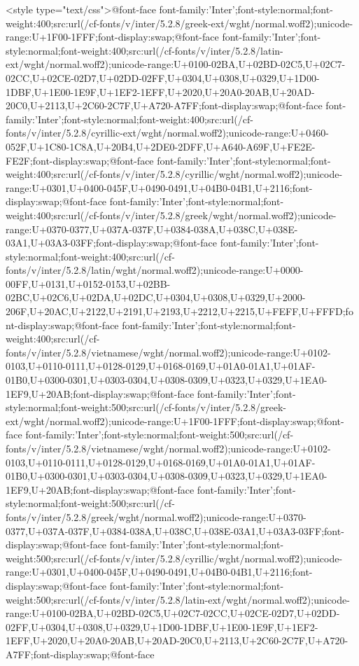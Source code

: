     <style type="text/css">@font-face {font-family:'Inter';font-style:normal;font-weight:400;src:url(/cf-fonts/v/inter/5.2.8/greek-ext/wght/normal.woff2);unicode-range:U+1F00-1FFF;font-display:swap;}@font-face {font-family:'Inter';font-style:normal;font-weight:400;src:url(/cf-fonts/v/inter/5.2.8/latin-ext/wght/normal.woff2);unicode-range:U+0100-02BA,U+02BD-02C5,U+02C7-02CC,U+02CE-02D7,U+02DD-02FF,U+0304,U+0308,U+0329,U+1D00-1DBF,U+1E00-1E9F,U+1EF2-1EFF,U+2020,U+20A0-20AB,U+20AD-20C0,U+2113,U+2C60-2C7F,U+A720-A7FF;font-display:swap;}@font-face {font-family:'Inter';font-style:normal;font-weight:400;src:url(/cf-fonts/v/inter/5.2.8/cyrillic-ext/wght/normal.woff2);unicode-range:U+0460-052F,U+1C80-1C8A,U+20B4,U+2DE0-2DFF,U+A640-A69F,U+FE2E-FE2F;font-display:swap;}@font-face {font-family:'Inter';font-style:normal;font-weight:400;src:url(/cf-fonts/v/inter/5.2.8/cyrillic/wght/normal.woff2);unicode-range:U+0301,U+0400-045F,U+0490-0491,U+04B0-04B1,U+2116;font-display:swap;}@font-face {font-family:'Inter';font-style:normal;font-weight:400;src:url(/cf-fonts/v/inter/5.2.8/greek/wght/normal.woff2);unicode-range:U+0370-0377,U+037A-037F,U+0384-038A,U+038C,U+038E-03A1,U+03A3-03FF;font-display:swap;}@font-face {font-family:'Inter';font-style:normal;font-weight:400;src:url(/cf-fonts/v/inter/5.2.8/latin/wght/normal.woff2);unicode-range:U+0000-00FF,U+0131,U+0152-0153,U+02BB-02BC,U+02C6,U+02DA,U+02DC,U+0304,U+0308,U+0329,U+2000-206F,U+20AC,U+2122,U+2191,U+2193,U+2212,U+2215,U+FEFF,U+FFFD;font-display:swap;}@font-face {font-family:'Inter';font-style:normal;font-weight:400;src:url(/cf-fonts/v/inter/5.2.8/vietnamese/wght/normal.woff2);unicode-range:U+0102-0103,U+0110-0111,U+0128-0129,U+0168-0169,U+01A0-01A1,U+01AF-01B0,U+0300-0301,U+0303-0304,U+0308-0309,U+0323,U+0329,U+1EA0-1EF9,U+20AB;font-display:swap;}@font-face {font-family:'Inter';font-style:normal;font-weight:500;src:url(/cf-fonts/v/inter/5.2.8/greek-ext/wght/normal.woff2);unicode-range:U+1F00-1FFF;font-display:swap;}@font-face {font-family:'Inter';font-style:normal;font-weight:500;src:url(/cf-fonts/v/inter/5.2.8/vietnamese/wght/normal.woff2);unicode-range:U+0102-0103,U+0110-0111,U+0128-0129,U+0168-0169,U+01A0-01A1,U+01AF-01B0,U+0300-0301,U+0303-0304,U+0308-0309,U+0323,U+0329,U+1EA0-1EF9,U+20AB;font-display:swap;}@font-face {font-family:'Inter';font-style:normal;font-weight:500;src:url(/cf-fonts/v/inter/5.2.8/greek/wght/normal.woff2);unicode-range:U+0370-0377,U+037A-037F,U+0384-038A,U+038C,U+038E-03A1,U+03A3-03FF;font-display:swap;}@font-face {font-family:'Inter';font-style:normal;font-weight:500;src:url(/cf-fonts/v/inter/5.2.8/cyrillic/wght/normal.woff2);unicode-range:U+0301,U+0400-045F,U+0490-0491,U+04B0-04B1,U+2116;font-display:swap;}@font-face {font-family:'Inter';font-style:normal;font-weight:500;src:url(/cf-fonts/v/inter/5.2.8/latin-ext/wght/normal.woff2);unicode-range:U+0100-02BA,U+02BD-02C5,U+02C7-02CC,U+02CE-02D7,U+02DD-02FF,U+0304,U+0308,U+0329,U+1D00-1DBF,U+1E00-1E9F,U+1EF2-1EFF,U+2020,U+20A0-20AB,U+20AD-20C0,U+2113,U+2C60-2C7F,U+A720-A7FF;font-display:swap;}@font-face 